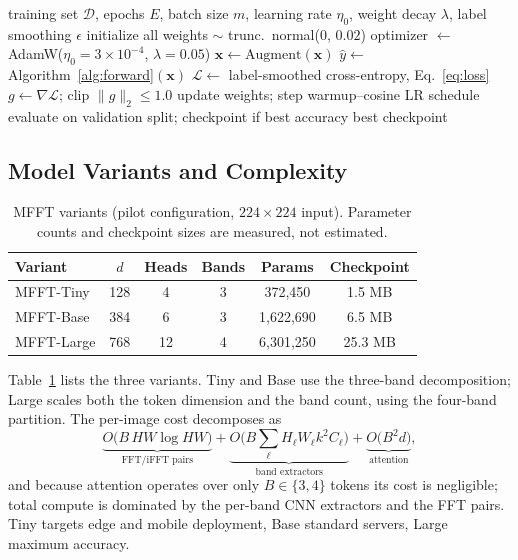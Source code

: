 \documentclass[journal]{IEEEtran}
\begin{document}
\begin{algorithm}[!t]
\caption{MFFT training procedure (pilot protocol)}
\label{alg:train}
\begin{algorithmic}[1]
\REQUIRE training set $\mathcal{D}$, epochs $E$, batch size $m$, learning rate $\eta_0$, weight decay $\lambda$, label smoothing $\epsilon$
\STATE initialize all weights $\sim$ trunc.\ normal(0, $0.02$)
\STATE optimizer $\leftarrow$ AdamW($\eta_0{=}3{\times}10^{-4}$, $\lambda{=}0.05$)
        \STATE $\mathbf{x} \leftarrow \mathrm{Augment}(\mathbf{x})$ 
        \STATE $\hat{y} \leftarrow$ Algorithm~\ref{alg:forward}$(\mathbf{x})$
        \STATE $\mathcal{L} \leftarrow$ label-smoothed cross-entropy, Eq.~\eqref{eq:loss}
        \STATE $g \leftarrow \nabla\mathcal{L}$; clip $\|g\|_2 \le 1.0$
        \STATE update weights; step warmup--cosine LR schedule
    \ENDFOR
    \STATE evaluate on validation split; checkpoint if best accuracy
\ENDFOR
\RETURN best checkpoint
\end{algorithmic}
\end{algorithm}

\subsection{Model Variants and Complexity}
\begin{table}[!t]
\renewcommand{\arraystretch}{1.2}
\caption{MFFT variants (pilot configuration, $224\times224$ input). Parameter counts and checkpoint sizes are measured, not estimated.}
\label{tab:variants}
\centering
\begin{tabular}{lccccc}
\toprule
Variant & $d$ & Heads & Bands & Params & Checkpoint \\
\midrule
MFFT-Tiny  & 128 & 4  & 3 & 372{,}450   & 1.5 MB \\
MFFT-Base  & 384 & 6  & 3 & 1{,}622{,}690 & 6.5 MB \\
MFFT-Large & 768 & 12 & 4 & 6{,}301{,}250 & 25.3 MB \\
\bottomrule
\end{tabular}
\end{table}
Table~\ref{tab:variants} lists the three variants. Tiny and Base use the three-band decomposition; Large scales both the token dimension and the band count, using the four-band partition. The per-image cost decomposes as
\begin{equation}
\underbrace{O\!\big(B\, HW \log HW\big)}_{\text{FFT/iFFT pairs}} +
\underbrace{O\!\big(B \sum_{\ell} H_\ell W_\ell k^2 C_\ell\big)}_{\text{band extractors}} +
\underbrace{O\!\big(B^2 d\big)}_{\text{attention}},
\label{eq:complexity}
\end{equation}
and because attention operates over only $B \in \{3,4\}$ tokens its cost is negligible; total compute is dominated by the per-band CNN extractors and the FFT pairs. Tiny targets edge and mobile deployment, Base standard servers, Large maximum accuracy.
\end{document}
